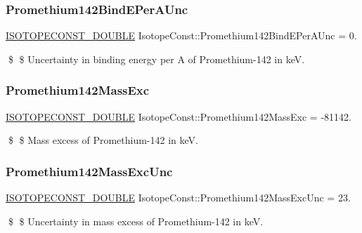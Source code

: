 \subsubsection{\texorpdfstring{Promethium142\+Bind\+E\+Per\+A\+Unc}{Promethium142BindEPerAUnc}}
{\footnotesize\ttfamily \mbox{\hyperlink{group___isotope_const-_macros_ga8f45a7272ce02c0b4c65c44636ed719a}{I\+S\+O\+T\+O\+P\+E\+C\+O\+N\+S\+T\+\_\+\+D\+O\+U\+B\+LE}} Isotope\+Const\+::\+Promethium142\+Bind\+E\+Per\+A\+Unc = 0.}

\$ \$ Uncertainty in binding energy per A of Promethium-\/142 in keV. \mbox{\label{group___isotope_const-_promethium-_pm142_gaeba01f88e59dbd5a0435740e840bbbba}} 
\subsubsection{\texorpdfstring{Promethium142\+Mass\+Exc}{Promethium142MassExc}}
{\footnotesize\ttfamily \mbox{\hyperlink{group___isotope_const-_macros_ga8f45a7272ce02c0b4c65c44636ed719a}{I\+S\+O\+T\+O\+P\+E\+C\+O\+N\+S\+T\+\_\+\+D\+O\+U\+B\+LE}} Isotope\+Const\+::\+Promethium142\+Mass\+Exc = -\/81142.}

\$ \$ Mass excess of Promethium-\/142 in keV. \mbox{\label{group___isotope_const-_promethium-_pm142_ga35f31e84e04dd6bc36f4bd9fa1c4de29}} 
\subsubsection{\texorpdfstring{Promethium142\+Mass\+Exc\+Unc}{Promethium142MassExcUnc}}
{\footnotesize\ttfamily \mbox{\hyperlink{group___isotope_const-_macros_ga8f45a7272ce02c0b4c65c44636ed719a}{I\+S\+O\+T\+O\+P\+E\+C\+O\+N\+S\+T\+\_\+\+D\+O\+U\+B\+LE}} Isotope\+Const\+::\+Promethium142\+Mass\+Exc\+Unc = 23.}

\$ \$ Uncertainty in mass excess of Promethium-\/142 in keV. \mbox{\label{group___isotope_const-_promethium-_pm142_gaf008044d2bc69100e66d027e7975a8a1}} 
